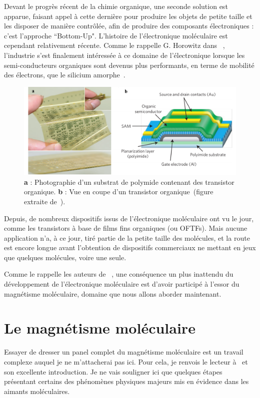 Devant le progrès récent de la chimie organique, une seconde solution est apparue, faisant appel à cette dernière  pour produire les objets de petite taille et les disposer de manière contrôlée, afin de produire des composants électroniques : c'est l'approche ``Bottom-Up". L'histoire de l'électronique moléculaire est cependant relativement récente. Comme le rappelle G. Horowitz dans~\cite{Klauk2007} , l'industrie s'est finalement intéressée à ce domaine de l'électronique lorsque les semi-conducteurs organiques sont devenus plus performants, en terme de mobilité des électrons, que le silicium amorphe~\cite{Lin1997}.
\begin{figure}
\centering \includegraphics[scale=0.45]{Spintronique/MolecularElec/MolecularElec.pdf}
\caption{\textbf{a} : Photographie d'un substrat de polymide contenant des transistor organique. \textbf{b} : Vue en coupe d'un transistor organique~(figure extraite de~\cite{Sekitani2010}).}
\label{MolecularElec}
\end{figure}


Depuis, de nombreux dispositifs issus de l'électronique moléculaire ont vu le jour, comme les  transistors à base de films fins organiques (ou OFTFs). Mais aucune application n'a, à ce jour, tiré partie de la petite taille des molécules, et la route est encore longue avant l'obtention de dispositifs commerciaux ne mettant en jeux que quelques molécules, voire une seule.

Comme le rappelle les auteurs de~\cite{Gatteschi2006} , une conséquence un plus inattendu du développement de l'électronique moléculaire est d'avoir participé à l'essor du magnétisme moléculaire, domaine que nous allons aborder maintenant.


\section{Le magnétisme moléculaire}
Essayer de dresser un panel complet du magnétisme moléculaire est un travail complexe auquel je ne m'attacherai pas ici. Pour cela, je renvois le lecteur à~\cite{Gatteschi2006} et son excellente introduction. Je ne vais souligner ici que quelques étapes présentant certains des phénomènes physiques majeurs mis en évidence dans les aimants moléculaires.


